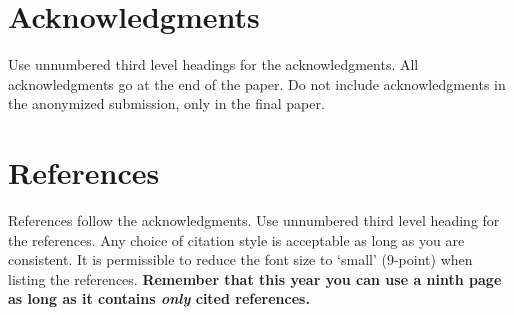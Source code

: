 \documentclass{article} %
\begin{document}
\section*{Acknowledgments}

Use unnumbered third level headings for the acknowledgments. All
acknowledgments go at the end of the paper. Do not include 
acknowledgments in the anonymized submission, only in the 
final paper. 

\section*{References}

References follow the acknowledgments. Use unnumbered third level heading for
the references. Any choice of citation style is acceptable as long as you are
consistent. It is permissible to reduce the font size to `small' (9-point) 
when listing the references. {\bf Remember that this year you can use
a ninth page as long as it contains \emph{only} cited references.}

\small{

}
\end{document}
